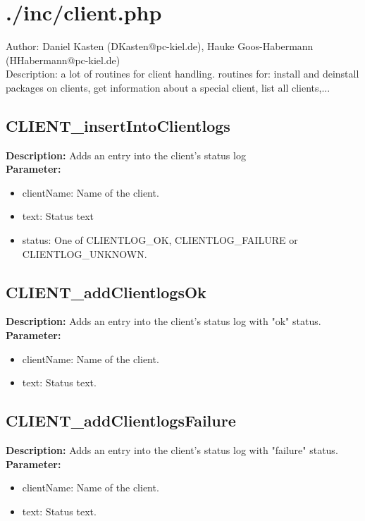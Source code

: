 \newpage\section{./inc/client.php}
 Author: Daniel Kasten (DKasten@pc-kiel.de), Hauke Goos-Habermann (HHabermann@pc-kiel.de)\\
 Description: a lot of routines for client handling. routines for: install and deinstall packages on clients, get information about a special client, list all clients,...\\

\subsection{CLIENT\_insertIntoClientlogs}
\textbf{Description:} Adds an entry into the client's status log\\
\textbf{Parameter:}
\begin{itemize}
\item clientName: Name of the client.
\item text: Status text
\item status: One of CLIENTLOG\_OK, CLIENTLOG\_FAILURE or CLIENTLOG\_UNKNOWN.
\end{itemize}

\subsection{CLIENT\_addClientlogsOk}
\textbf{Description:} Adds an entry into the client's status log with "ok" status.\\
\textbf{Parameter:}
\begin{itemize}
\item clientName: Name of the client.
\item text: Status text.
\end{itemize}

\subsection{CLIENT\_addClientlogsFailure}
\textbf{Description:} Adds an entry into the client's status log with "failure" status.\\
\textbf{Parameter:}
\begin{itemize}
\item clientName: Name of the client.
\item text: Status text.
\end{itemize}

